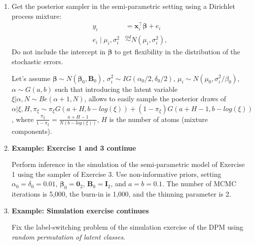 \begin{enumerate}
	\item Get the posterior sampler in the semi-parametric setting using a Dirichlet process mixture:
	\begin{align*}
		y_i&=\boldsymbol{x}_i^{\top}\boldsymbol{\beta}+e_i\\
		e_i\mid \mu_i,\sigma_i^2 &\stackrel{iid}{\sim} N(\mu_i,\sigma_i^2),
	\end{align*}
	Do not include the intercept in $\boldsymbol{\beta}$ to get flexibility in the distribution of the stochastic errors.
	
	Let's assume $\boldsymbol{\beta}\sim N(\boldsymbol{\beta}_0,\boldsymbol{B}_0)$, $\sigma_i^2\sim IG(\alpha_0/2,\delta_0/2)$, $\mu_i\sim N(\mu_0,\sigma_i^2/\beta_0)$, $\alpha\sim G(a,b)$ such that introducing the latent variable $\xi|\alpha,N\sim Be(\alpha+1,N)$, allows to easily sample the posterior draws of  $\alpha|\xi,H,\pi_{\xi}\sim\pi_{\xi}{G}(a+H,b-log(\xi))+(1-\pi_{\xi}){G}(a+H-1,b-log(\xi))$, where $\frac{\pi_{\xi}}{1-\pi_{\xi}}=\frac{a+H-1}{N(b-log(\xi))}$, $H$ is the number of atoms (mixture components). 
	
	\item  \textbf{Example: Exercise 1 and 3 continue}
	
	Perform inference in the simulation of the semi-parametric model of Exercise 1 using the sampler of Exercise 3. Use non-informative priors, setting $\alpha_{0}=\delta_{0}=0.01$, $\boldsymbol{\beta}_{0}=\boldsymbol{0}_2$, $\boldsymbol{B}_{0}=\boldsymbol{I}_2$, and $a=b=0.1$. The number of MCMC iterations is 5,000, the burn-in is 1,000, and the thinning parameter is 2. 
	
	\item \textbf{Example: Simulation exercise continues}
	
	Fix the label-switching problem of the simulation exercise of the DPM using \textit{random permutation of latent classes}.
  
\end{enumerate}

